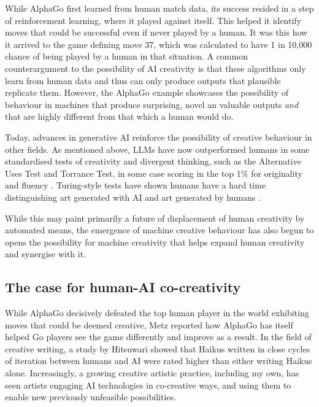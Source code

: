 While AlphaGo first learned from human match data, its success resided in a step of reinforcement learning, where it played against itself. This helped it identify moves that could be successful even if never played by a human. It was this how it arrived to the game defining move 37, which was calculated to have 1 in 10,000 chance of being played by a human in that situation. A common counterargument to the possibility of AI creativity is that these algorithms only learn from human data and thus can only produce outputs that plausible replicate them. However, the AlphaGo example showcases the possibility of behaviour in machines that produce surprising, novel an valuable outputs \textit{and} that are highly different from that which a human would do.

Today, advances in generative AI reinforce the possibility of creative behaviour in other fields. As mentioned above, LLMs have now outperformed humans in some standardised tests of creativity and divergent thinking, such as the Alternative Uses Test and Torrance Test, in some case scoring in the top 1\% for originality and fluency \cite{Hubert2024-kv, Guzik2023-cl, Koivisto2023-lw}. Turing-style tests have shown humans have a hard time distinguishing art generated with AI and art generated by humans \cite{Alexander2024-pz}. 

While this may paint primarily a future of displacement of human creativity by automated means, the emergence of machine creative behaviour has also begun to opens the possibility for machine creativity that helps expand human creativity and synergise with it. 

\subsection{The case for human-AI co-creativity}

While AlphaGo decisively defeated the top human player in the world exhibiting moves that could be deemed creative, Metz \cite{Metz2016-dm} reported how AlphaGo has itself helped Go players see the game differently and improve as a result. In the field of creative writing, a study by Hitsuwari \cite{Hitsuwari2023-tw} showed that Haikus written in close cycles of iteration between humans and AI were rated higher than either writing Haikus alone. Increasingly, a growing creative artistic practice, including my own, has seen artists engaging AI technologies in co-creative ways, and using them to enable new previously unfeasible possibilities. 

